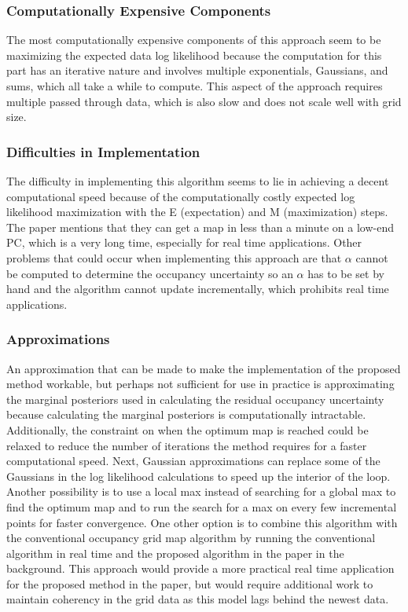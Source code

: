 \documentclass[10pt, titlepage, onecolumn, fleqn]{article}
\begin{document}
\subsubsection{Computationally Expensive Components}
The most computationally expensive components of this approach seem to be maximizing the expected data log likelihood because the computation for this part has an iterative nature and involves multiple exponentials, Gaussians, and sums, which all take a while to compute. This aspect of the approach requires multiple passed through data, which is also slow and does not scale well with grid size.

\subsubsection{Difficulties in Implementation}
The difficulty in implementing this algorithm seems to lie in achieving a decent computational speed because of the computationally costly expected log likelihood maximization with the E (expectation) and M (maximization) steps. The paper mentions that they can get a map in less than a minute on a low-end PC, which is a very long time, especially for real time applications. Other problems that could occur when implementing this approach are that $\alpha$ cannot be computed to determine the occupancy uncertainty so an $\alpha$ has to be set by hand and the algorithm cannot update incrementally, which prohibits real time applications.

\subsubsection{Approximations}
An approximation that can be made to make the implementation of the proposed method workable, but perhaps not sufficient for use in practice is approximating the marginal posteriors used in calculating the residual occupancy uncertainty because calculating the marginal posteriors is computationally intractable. Additionally, the constraint on when the optimum map is reached could be relaxed to reduce the number of iterations the method requires for a faster computational speed. Next, Gaussian approximations can replace some of the Gaussians in the log likelihood calculations to speed up the interior of the loop. Another possibility is to use a local max instead of searching for a global max to find the optimum map and to run the search for a max on every few incremental points for faster convergence. One other option is to combine this algorithm with the conventional occupancy grid map algorithm by running the conventional algorithm in real time and the proposed algorithm in the paper in the background. This approach would provide a more practical real time application for the proposed method in the paper, but would require additional work to maintain coherency in the grid data as this model lags behind the newest data.
\end{document}
